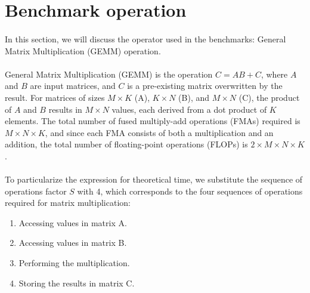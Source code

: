\section{Benchmark operation}

     \paragraph*{}
     In this section, we will discuss the operator used in the benchmarks: General Matrix 
     Multiplication (GEMM) operation.
     \par

     \paragraph*{}
     General Matrix Multiplication (GEMM) is the operation $C = AB + C$, where $A$ and $B$ are input matrices, 
     and $C$ is a pre-existing matrix overwritten by the result. For matrices of sizes 
     $M \times K$ (A), $K \times N$ (B), and $M \times N$ (C), the product of $A$ and $B$ results in 
     $M \times N$ values, each derived from a dot product of $K$ elements. The total number of fused 
     multiply-add operations (FMAs) required is $M \times N \times K$, and since each FMA consists of 
     both a multiplication and an addition, the total number of floating-point operations (FLOPs) is 
     $2 \times M \times N \times K$.
     \par

     \paragraph*{}
     To particularize the expression for theoretical time, we substitute the sequence of operations factor $S$ with 4, 
     which corresponds to the four sequences of operations required for matrix multiplication:
     \begin{enumerate} 
          \item Accessing values in matrix A. 
          \item Accessing values in matrix B. 
          \item Performing the multiplication. 
          \item Storing the results in matrix C. 
     \end{enumerate}
     \par



